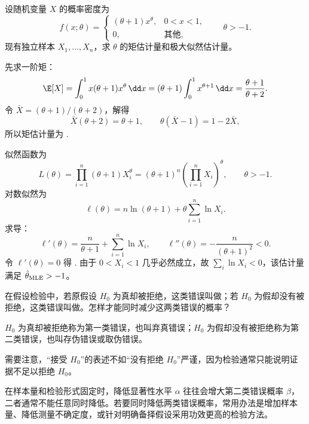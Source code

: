 \begin{question}[矩估计与极大似然估计]
设随机变量 $X$ 的概率密度为
\[
f(x;\theta)=
\begin{cases}
(\theta+1)x^\theta,&0<x<1,\\
0,&\text{其他},
\end{cases}
\qquad \theta>-1.
\]
现有独立样本 $X_1,\ldots,X_n$，求 $\theta$ 的矩估计量和极大似然估计量。
\begin{solution}
先求一阶矩：
\[
\E[X]=\int_0^1 x(\theta+1)x^\theta\,\dd x
=(\theta+1)\int_0^1x^{\theta+1}\,\dd x
=\frac{\theta+1}{\theta+2}.
\]
令 $\bar X=(\theta+1)/(\theta+2)$，解得
\[
\bar X(\theta+2)=\theta+1,
\qquad
\theta(\bar X-1)=1-2\bar X,
\]
所以矩估计量为
.

似然函数为
\[
L(\theta)=\prod_{i=1}^n(\theta+1)X_i^\theta
=(\theta+1)^n\left(\prod_{i=1}^nX_i\right)^\theta,
\qquad \theta>-1.
\]
对数似然为
\[
\ell(\theta)=n\ln(\theta+1)+\theta\sum_{i=1}^n\ln X_i.
\]
求导：
\[
\ell'(\theta)=\frac{n}{\theta+1}+\sum_{i=1}^n\ln X_i,
\qquad
\ell''(\theta)=-\frac{n}{(\theta+1)^2}<0.
\]
令 $\ell'(\theta)=0$ 得
.
由于 $0<X_i<1$ 几乎必然成立，故 $\sum_i\ln X_i<0$，该估计量满足 $\hat\theta_{\rm MLE}>-1$。
\end{solution}
\end{question}

\begin{question}[假设检验错误]
在假设检验中，若原假设 $H_0$ 为真却被拒绝，这类错误叫做\underline{\hspace{2.5em}}；若 $H_0$ 为假却没有被拒绝，这类错误叫做\underline{\hspace{2.5em}}。怎样才能同时减少这两类错误的概率？
\begin{solution}
$H_0$ 为真却被拒绝称为第一类错误，也叫弃真错误；$H_0$ 为假却没有被拒绝称为第二类错误，也叫存伪错误或取伪错误。

需要注意，“接受 $H_0$”的表述不如“没有拒绝 $H_0$”严谨，因为检验通常只能说明证据不足以拒绝 $H_0$。

在样本量和检验形式固定时，降低显著性水平 $\alpha$ 往往会增大第二类错误概率 $\beta$，二者通常不能任意同时降低。若要同时降低两类错误概率，常用办法是增加样本量、降低测量不确定度，或针对明确备择假设采用功效更高的检验方法。
\end{solution}
\end{question}

